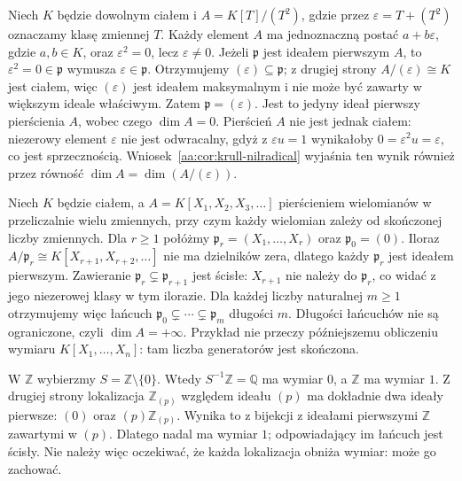\begin{przyklad}
\label{aa:prz:krull-dual-numbers}
Niech $K$ będzie dowolnym ciałem i
$A=K[T]/(T^2)$, gdzie przez
$\varepsilon=T+(T^2)$ oznaczamy klasę zmiennej $T$.
Każdy element $A$ ma jednoznaczną postać
$a+b\varepsilon$, gdzie $a,b\in K$, oraz
$\varepsilon^2=0$, lecz $\varepsilon\ne0$.
Jeżeli $\mathfrak p$ jest ideałem pierwszym $A$, to
$\varepsilon^2=0\in\mathfrak p$ wymusza
$\varepsilon\in\mathfrak p$. Otrzymujemy
$(\varepsilon)\subseteq\mathfrak p$; z drugiej strony
$A/(\varepsilon)\cong K$ jest ciałem, więc $(\varepsilon)$
jest ideałem maksymalnym i nie może być zawarty w większym
ideale właściwym. Zatem $\mathfrak p=(\varepsilon)$.
Jest to jedyny ideał pierwszy pierścienia $A$, wobec czego
$\dim A=0$. Pierścień $A$ nie jest jednak ciałem:
niezerowy element $\varepsilon$ nie jest odwracalny,
gdyż z $\varepsilon u=1$ wynikałoby
$0=\varepsilon^2u=\varepsilon$, co jest sprzecznością.
Wniosek~\ref{aa:cor:krull-nilradical} wyjaśnia ten wynik
również przez równość $\dim A=\dim(A/(\varepsilon))$.
\end{przyklad}

\begin{przyklad}
\label{aa:prz:krull-infinite-dimension}
Niech $K$ będzie ciałem, a
$A=K[X_1,X_2,X_3,\ldots]$ pierścieniem wielomianów
w przeliczalnie wielu zmiennych, przy czym każdy wielomian
zależy od skończonej liczby zmiennych. Dla $r\ge1$
połóżmy $\mathfrak p_r=(X_1,\ldots,X_r)$
oraz $\mathfrak p_0=(0)$. Iloraz
$A/\mathfrak p_r\cong K[X_{r+1},X_{r+2},\ldots]$
nie ma dzielników zera, dlatego każdy $\mathfrak p_r$
jest ideałem pierwszym. Zawieranie
$\mathfrak p_r\subsetneq\mathfrak p_{r+1}$ jest ścisłe:
$X_{r+1}$ nie należy do $\mathfrak p_r$, co widać
z jego niezerowej klasy w tym ilorazie.
Dla każdej liczby naturalnej $m\ge1$ otrzymujemy więc
łańcuch $\mathfrak p_0\subsetneq\cdots\subsetneq
\mathfrak p_m$ długości $m$. Długości łańcuchów
nie są ograniczone, czyli $\dim A=+\infty$.
Przykład nie przeczy późniejszemu obliczeniu wymiaru
$K[X_1,\ldots,X_n]$: tam liczba generatorów jest skończona.
\end{przyklad}
\begin{przyklad}\label{aa:prz:krull-local-example}
W $\mathbb Z$ wybierzmy $S=\mathbb Z\setminus\{0\}$.
Wtedy $S^{-1}\mathbb Z=\mathbb Q$ ma wymiar $0$,
a $\mathbb Z$ ma wymiar $1$. Z drugiej strony
lokalizacja $\mathbb Z_{(p)}$ względem ideału $(p)$
ma dokładnie dwa ideały pierwsze:
$(0)$ oraz $(p)\mathbb Z_{(p)}$. Wynika to z bijekcji
z ideałami pierwszymi $\mathbb Z$ zawartymi w $(p)$.
Dlatego nadal ma wymiar $1$; odpowiadający im łańcuch
jest ścisły. Nie należy więc oczekiwać, że każda
lokalizacja obniża wymiar: może go zachować.
\end{przyklad}

